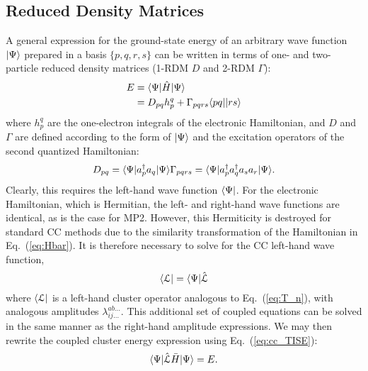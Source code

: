 \subsection{Reduced Density Matrices} \label{ss:rdm} A general expression
for the ground-state energy of an arbitrary wave function $| \Psi \rangle$
prepared in a basis $\{p,q,r,s\}$ can be written in terms of one- and
two-particle reduced density matrices (1-RDM $D$ and 2-RDM $\Gamma$):
\cite{Harris1992,Trucks1988}
\begin{equation} \label{eq:pdm_e}
    \begin{aligned} E & = \langle\Psi |\hat{H}| \Psi \rangle \\
      & = D_{pq}h_{p}^{q} + \Gamma_{pqrs}\langle pq || rs \rangle
    \end{aligned}
\end{equation} where $h_{p}^{q}$ are the one-electron integrals of the
electronic Hamiltonian, and $D$ and $\Gamma$ are defined according to the
form of $| \Psi \rangle$ and the excitation operators of the second quantized
Hamiltonian: \begin{subequations} \begin{equation} \label{eq:opdm}
    D_{pq} = \bra{\Psi}a_p^{\dagger}a_q\ket{\Psi}
\end{equation} \begin{equation} \label{eq:tpdm}
    \Gamma_{pqrs} = \bra{\Psi}a_p^{\dagger}a_q^{\dagger}a_sa_r\ket{\Psi}.
\end{equation} \end{subequations} 
Clearly, this requires the
left-hand wave function $\langle\Psi |$. For the electronic Hamiltonian,
which is Hermitian, the left- and right-hand wave functions are identical,
as is the case for MP2. However, this Hermiticity is destroyed for standard
CC methods due to the similarity transformation of the Hamiltonian in
Eq.~(\ref{eq:Hbar}).\cite{Crawford2000} It is therefore necessary to solve for the CC left-hand
wave function, \begin{equation} \label{eq:cc_lwfn}
    \langle\mathcal{L} | = \langle\Psi |\hat{\mathcal{L}}
\end{equation} where $\langle\mathcal{L} |$ is a left-hand cluster
operator analogous to Eq.~(\ref{eq:T_n}), with analogous amplitudes
$\lambda_{ij\ldots}^{ab\ldots}$. This additional set of coupled
equations can be solved in the same manner as the right-hand amplitude
expressions. We may then rewrite the coupled cluster energy expression
using Eq.~(\ref{eq:cc_TISE}): \begin{equation} \label{eq:cc_energy_total}
    \langle\Psi |\hat{\mathcal{L}}\bar{H}| \Psi \rangle = E.
\end{equation}

